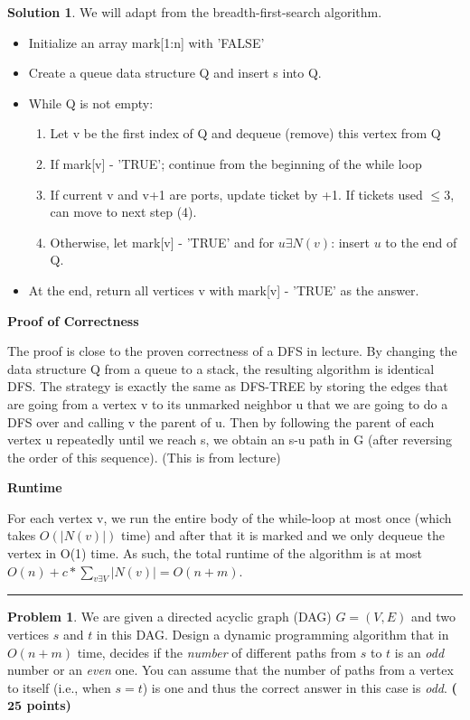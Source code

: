 \documentclass{article}
\theoremstyle{definition}
\newtheorem{problem}{Problem}
\def\fline{\rule{0.75\linewidth}{0.5pt}}
\newcommand{\finishline}{\begin{center}\fline\end{center}}
\newtheorem*{solution*}{Solution}
\newenvironment{solution}{\begin{solution*}}{{\finishline} \end{solution*}}
\newcommand{\grade}[1]{\hfill{\textbf{($\mathbf{#1}$ points)}}}
\begin{document}
\begin{solution}
	\item We will adapt from the breadth-first-search algorithm.
	\begin{itemize}
	\item Initialize an array mark[1:n] with 'FALSE'
	\item Create a queue data structure Q and insert s into Q.
	\item While Q is not empty:
	\begin{enumerate}
		\item Let v be the first index of Q and dequeue (remove) this vertex from Q
		\item If mark[v] - 'TRUE'; continue from the beginning of the while loop
		\item If current v and v+1 are ports, update ticket by +1. If tickets used $\leq 3$, can move to next step (4).
		\item Otherwise, let mark[v] - 'TRUE' and for $u \exists N(v)$: insert $u$ to the end of Q.
	\end{enumerate}
	\item At the end, return all vertices v with mark[v] - 'TRUE' as the answer.
	\end{itemize}
	
	\item \textbf{Proof of Correctness}
	\item The proof is close to the proven correctness of a DFS in lecture. By changing the data structure Q from a queue to a stack, the resulting algorithm is identical DFS. The strategy is exactly the same as DFS-TREE by storing the edges that are going from a vertex v to its unmarked neighbor u that we are going to do a DFS over and calling v the parent of u. Then by following the parent of each vertex u repeatedly until we reach s, we obtain an s-u path in G (after reversing the order of this sequence). (This is from lecture)

	\item \textbf{Runtime}
	\item For each vertex v, we run the entire body of the while-loop at most once (which takes $O(|N(v)|)$ time) and after that it is marked and we only dequeue the vertex in O(1) time.  As such, the total runtime of the algorithm is at most $O(n) +c * \sum_{v \exists V}|N(v)|= O(n+m)$.

\end{solution}	

\medskip

\begin{problem}
	We are given a directed acyclic graph (DAG) $G=(V,E)$ and two vertices $s$ and $t$ in this DAG. Design a dynamic programming algorithm that in $O(n+m)$ time, decides if the \emph{number} of different paths from $s$ to $t$ is an \emph{odd} number or an \emph{even} one. You can assume that the number of paths from a vertex to itself (i.e., when $s=t$) is one and thus the correct answer in this case is \emph{odd}. \grade{25}

\end{problem}
\end{document}
